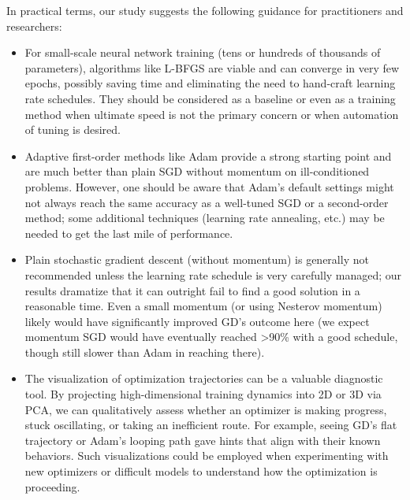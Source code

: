 \documentclass[12pt]{article}
\begin{document}
In practical terms, our study suggests the following guidance for practitioners and researchers:
\begin{itemize}
\item For small-scale neural network training (tens or hundreds of thousands of parameters), algorithms like L-BFGS are viable and can converge in very few epochs, possibly saving time and eliminating the need to hand-craft learning rate schedules. They should be considered as a baseline or even as a training method when ultimate speed is not the primary concern or when automation of tuning is desired.
\item Adaptive first-order methods like Adam provide a strong starting point and are much better than plain SGD without momentum on ill-conditioned problems. However, one should be aware that Adam’s default settings might not always reach the same accuracy as a well-tuned SGD or a second-order method; some additional techniques (learning rate annealing, etc.) may be needed to get the last mile of performance.
\item Plain stochastic gradient descent (without momentum) is generally not recommended unless the learning rate schedule is very carefully managed; our results dramatize that it can outright fail to find a good solution in a reasonable time. Even a small momentum (or using Nesterov momentum) likely would have significantly improved GD’s outcome here (we expect momentum SGD would have eventually reached >90\% with a good schedule, though still slower than Adam in reaching there).
\item The visualization of optimization trajectories can be a valuable diagnostic tool. By projecting high-dimensional training dynamics into 2D or 3D via PCA, we can qualitatively assess whether an optimizer is making progress, stuck oscillating, or taking an inefficient route. For example, seeing GD’s flat trajectory or Adam’s looping path gave hints that align with their known behaviors. Such visualizations could be employed when experimenting with new optimizers or difficult models to understand how the optimization is proceeding.
\end{itemize}
\end{document}
